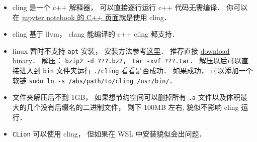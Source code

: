 
\begin{issues}
\issueDraft
\end{issues}

\begin{itemize}
\item cling 是一个 c++ 解释器， 可以直接逐行运行 c++ 代码无需编译． 你可以在 \href{https://jupyter.org/try}{jupyter notebook 的 C++ 页面}就是使用 cling．
\item cling 基于 llvm， clang 能编译的 c++ cling 都支持．
\item linux 暂时不支持 \verb|apt| 安装， 安装方法参考\href{https://kaustubh13.medium.com/how-to-install-cling-on-linux-or-wsl-8125798ed9b9}{这里}． 推荐直接 \href{https://root.cern/download/cling/}{download binary}． 解压： \verb|bzip2 -d ???.bz2|， \verb|tar -xvf ???.tar|． 解压以后可以直接进入到 \verb|bin| 文件夹运行 \verb|./cling| 看看是否成功． 如果成功， 可以添加一个软链 \verb|sudo ln -s /abs/path/to/cling /usr/bin/|．
\item 文件夹解压后不到 1GB， 如果想节约空间可以删掉所有 \verb|.a| 文件以及体积最大的几个没有后缀名的二进制文件， 剩下 100MB 左右, 貌似不影响 cling 运行．
\item \verb|CLion| 可以使用 cling， 但如果在 WSL 中安装貌似会出问题．
\end{itemize}
